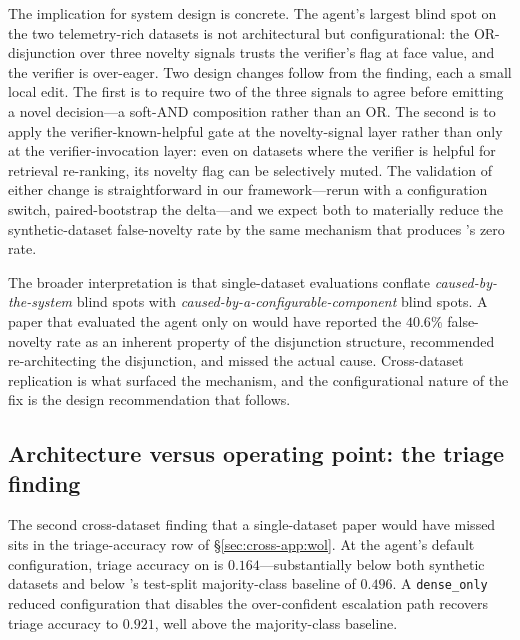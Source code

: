 The implication for system design is concrete. The agent's largest blind spot on the two telemetry-rich datasets is not architectural but configurational: the OR-disjunction over three novelty signals trusts the verifier's flag at face value, and the verifier is over-eager. Two design changes follow from the finding, each a small local edit. The first is to require two of the three signals to agree before emitting a novel decision---a soft-AND composition rather than an OR. The second is to apply the verifier-known-helpful gate at the novelty-signal layer rather than only at the verifier-invocation layer: even on datasets where the verifier is helpful for retrieval re-ranking, its novelty flag can be selectively muted. The validation of either change is straightforward in our framework---rerun with a configuration switch, paired-bootstrap the delta---and we expect both to materially reduce the synthetic-dataset false-novelty rate by the same mechanism that produces \dswol{}'s zero rate.

The broader interpretation is that single-dataset evaluations conflate \emph{caused-by-the-system} blind spots with \emph{caused-by-a-configurable-component} blind spots. A paper that evaluated the agent only on \dsob{} would have reported the $40.6\%$ false-novelty rate as an inherent property of the disjunction structure, recommended re-architecting the disjunction, and missed the actual cause. Cross-dataset replication is what surfaced the mechanism, and the configurational nature of the fix is the design recommendation that follows.

\subsection{Architecture versus operating point: the \dswol{} triage finding}
\label{sec:discussion:opspoint}

The second cross-dataset finding that a single-dataset paper would have missed sits in the triage-accuracy row of \S\ref{sec:cross-app:wol}. At the agent's default configuration, triage accuracy on \dswol{} is $0.164$---substantially below both synthetic datasets and below \dswol{}'s test-split majority-class baseline of $0.496$. A \texttt{dense\_only} reduced configuration that disables the over-confident escalation path recovers triage accuracy to $0.921$, well above the majority-class baseline.

